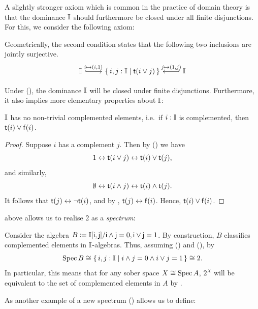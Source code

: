 A slightly stronger axiom which is common in the practice of domain theory is that the dominance $\mathbb{I}$ should furthermore be closed under all finite disjunctions. For this, we consider the following axiom:

\PrintAxiomL

Geometrically, the second condition states that the following two inclusions are jointly surjective. 
  \[ 
  \begin{tikzcd}
    \I \ar[r, hook, "{i \mapsto (i,1)}"] & \scomp{i,j : \I}{\ist{i\vee j}} & \I \ar[l, hook', "{j \mapsto (1,j)}"']
  \end{tikzcd}
  \]

Under (\AxiomL), the dominance $\mathbb{I}$ will be closed under finite disjunctions. Furthermore, it also implies more elementary properties about $\mathbb{I}$:

\begin{lemma}[\AxiomL, \AxiomSQCID]\label{lem:intisnotBoolean}
  $\mathbb{I}$ has no non-trivial complemented elements, i.e.\ if $i : \mathbb{I}$ is complemented, then $\mathsf{t}(i) \vee \mathsf{f}(i)$. 
\end{lemma}
\begin{proof}
  Suppose $i$ has a complement $j$. Then by (\AxiomL) we have
  \[ 1 \eq \ist{i\vee j} \eq \ist{i} \vee \ist{j}\text{,} \]
  and similarly,
  \[ \emp \eq \ist{i\wedge j} \eq \ist{i} \wedge \ist{j}\text{.} \]
  It follows that $\mathsf{t}(j) \leftrightarrow \neg \mathsf{t}(i)$, and by , $\mathsf{t}(j) \leftrightarrow \mathsf{f}(i)$. Hence, $\mathsf{t}(i) \vee \mathsf{f}(i)$.
\end{proof}

 above allows us to realise 2 as a \emph{spectrum}:

\begin{example}\label{exm:2issober}
  Consider the algebra $B \coloneq \mathbb{I}[\mathsf{i},\mathsf{j}]/{\mathsf{i}\wedge \mathsf{j} =0,\mathsf{i}\vee \mathsf{j} = 1}$. By construction, $B$ classifies complemented elements in $\mathbb{I}$-algebras. Thus, assuming (\AxiomL) and (\AxiomSQCI), by 
  \[ \spec B \cong \scomp{i,j : \I}{i \wedge j = 0 \wedge i \vee j = 1} \cong 2\text{.} \]
  In particular, this means that for any sober space $X \cong \operatorname{Spec} A$, $2^X$ will be equivalent to the set of complemented elements in $A$ by .
\end{example}

As another example of a new spectrum (\AxiomL) allows us to define:

